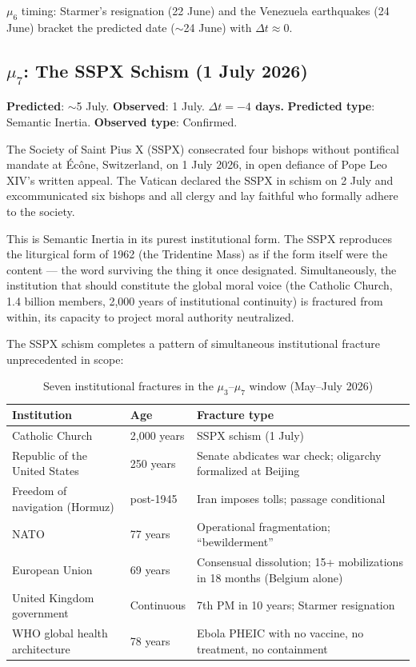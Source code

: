 \documentclass[12pt,a4paper]{article}
\begin{document}
$\mu_6$ timing: Starmer's resignation (22 June) and the Venezuela earthquakes (24 June) bracket the predicted date ($\sim$24 June) with $\Delta t \approx 0$.

\subsection{$\mu_7$: The SSPX Schism (1 July 2026)}\label{subsec:mu7}

\textbf{Predicted}: $\sim$5 July. \textbf{Observed}: 1 July. \textbf{$\Delta t = -4$ days.} \textbf{Predicted type}: Semantic Inertia. \textbf{Observed type}: Confirmed.

The Society of Saint Pius X (SSPX) consecrated four bishops without pontifical mandate at \'{E}c\^{o}ne, Switzerland, on 1 July 2026, in open defiance of Pope Leo XIV's written appeal. The Vatican declared the SSPX in schism on 2 July and excommunicated six bishops and all clergy and lay faithful who formally adhere to the society.

This is Semantic Inertia in its purest institutional form. The SSPX reproduces the liturgical form of 1962 (the Tridentine Mass) as if the form itself were the content --- the word surviving the thing it once designated. Simultaneously, the institution that should constitute the global moral voice (the Catholic Church, 1.4 billion members, 2,000 years of institutional continuity) is fractured from within, its capacity to project moral authority neutralized.

The SSPX schism completes a pattern of simultaneous institutional fracture unprecedented in scope:

\begin{table}[H]
\centering
\caption{Seven institutional fractures in the $\mu_3$--$\mu_7$ window (May--July 2026)}
\label{tab:seven_fractures}
\begin{tabularx}{\textwidth}{@{}llX@{}}
\toprule
\textbf{Institution} & \textbf{Age} & \textbf{Fracture type} \\
\midrule
Catholic Church & 2,000 years & SSPX schism (1 July) \\
Republic of the United States & 250 years & Senate abdicates war check; oligarchy formalized at Beijing \\
Freedom of navigation (Hormuz) & post-1945 & Iran imposes tolls; passage conditional \\
NATO & 77 years & Operational fragmentation; ``bewilderment'' \\
European Union & 69 years & Consensual dissolution; 15+ mobilizations in 18 months (Belgium alone) \\
United Kingdom government & Continuous & 7th PM in 10 years; Starmer resignation \\
WHO global health architecture & 78 years & Ebola PHEIC with no vaccine, no treatment, no containment \\
\bottomrule
\end{tabularx}
\end{table}
\end{document}
